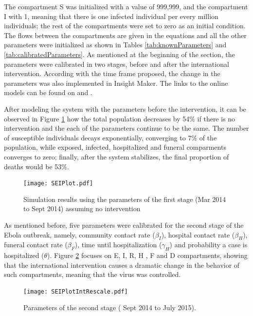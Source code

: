 The compartment S was initialized with a value of 999,999, and the compartment I with 1, meaning that there is one infected individual per every million individuals; the rest of the compartments were set to zero as an initial condition. The flows between the compartments are given in the equations and all the other parameters were initialized as shown in Tables   \ref{tab:knownParameters} and \ref{tab:calibratedParameters}.  As mentioned at the beginning of the section, the parameters were calibrated in two stages, before and after the international intervention. According with the time frame proposed, the change in the parameters was also implemented in Insight Maker. The links to the online models can be found on \cite{IM_AI} and  \cite{IM_BI}.


%
After modeling the system with the parameters before the intervention, it can be observed in Figure \ref{fig:LB_IM_NoIn} how the total population decreases by 54\% if there is no intervention and the each of the parameters continue to be the same. The number of susceptible individuals decays  exponentially, converging to 7\% of the population, while exposed, infected, hospitalized and funeral comparments converges to zero; finally, after the system stabilizes, the final proportion of deaths would be 53\%. 

\begin{figure}[!h]
  \centering
  \texttt{[image: SEIPlot.pdf]}
  \caption{Simulation results using the parameters of the first stage (Mar 2014  to Sept 2014) assuming no intervention}
\label{fig:LB_IM_NoIn} 
\end{figure}

As mentioned before, five parameters were calibrated for the second stage of the Ebola outbreak, namely, community contact rate ($\beta_I$), hospital contact rate ($\beta_H$), funeral contact rate ($\beta_F$), time until hospitalization ($\gamma_H$) and probability a case is hospitalized ($\theta$). Figure \ref{fig:LB_IM_In} focuses on E, I, R, H , F and D compartments, showing that the international intervention causes a dramatic change in the behavior of such compartments, meaning that the virus was controlled.

\begin{figure}[h!]
  \centering
  \texttt{[image: SEIPlotIntRescale.pdf]} 
\caption{ Parameters of the second stage ( Sept 2014 to July 2015).} 
\label{fig:LB_IM_In} 
\end{figure}






